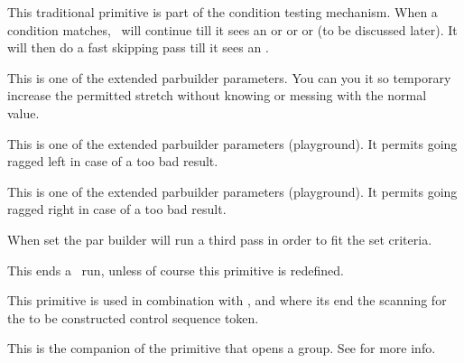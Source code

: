 This traditional primitive is part of the condition testing mechanism. When a
condition matches, \TEX\ will continue till it sees an  or \prm
{or} or  (to be discussed later). It will then do a fast skipping
pass till it sees an .

\stopoldprimitive

\startoldprimitive[title={\prm {emergencyextrastretch}}]

This is one of the extended parbuilder parameters. You can you it so temporary
increase the permitted stretch without knowing or messing with the normal value.

\stopoldprimitive

\startnewprimitive[title={\prm {emergencyleftskip}}]

This is one of the extended parbuilder parameters (playground). It permits going
ragged left in case of a too bad result.

\stopnewprimitive

\startnewprimitive[title={\prm {emergencyrightskip}}]

This is one of the extended parbuilder parameters (playground). It permits going
ragged right in case of a too bad result.

\stopnewprimitive

\startoldprimitive[title={\prm {emergencystretch}}]

When set the par builder will run a third pass in order to fit the set criteria.

\stopoldprimitive


\startoldprimitive[title={\prm {end}}]

This ends a \TEX\ run, unless of course this primitive is redefined.

\stopoldprimitive

\startoldprimitive[title={\prm {endcsname}}]

This primitive is used in combination with ,  and
 where its end the scanning for the to be constructed control
sequence token.

\stopoldprimitive

\startoldprimitive[title={\prm {endgroup}}]

This is the companion of the  primitive that opens a group. See
 for more info.


